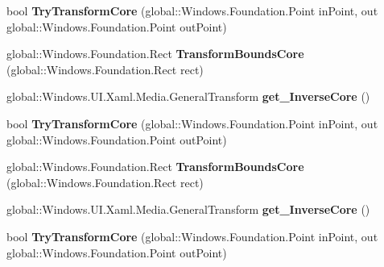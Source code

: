 \begin{DoxyCompactItemize}
bool {\bfseries Try\+Transform\+Core} (global\+::\+Windows.\+Foundation.\+Point in\+Point, out global\+::\+Windows.\+Foundation.\+Point out\+Point)
\item 
\mbox{\label{interface_windows_1_1_u_i_1_1_xaml_1_1_media_1_1_i_general_transform_overrides_a20e0e564fddb97a43b3c62931dd0dafa}} 
global\+::\+Windows.\+Foundation.\+Rect {\bfseries Transform\+Bounds\+Core} (global\+::\+Windows.\+Foundation.\+Rect rect)
\item 
\mbox{\label{interface_windows_1_1_u_i_1_1_xaml_1_1_media_1_1_i_general_transform_overrides_a7ee385c00a216b72154039895b723310}} 
global\+::\+Windows.\+U\+I.\+Xaml.\+Media.\+General\+Transform {\bfseries get\+\_\+\+Inverse\+Core} ()
\item 
\mbox{\label{interface_windows_1_1_u_i_1_1_xaml_1_1_media_1_1_i_general_transform_overrides_a6af63aa723b299fb2551d307070b5098}} 
bool {\bfseries Try\+Transform\+Core} (global\+::\+Windows.\+Foundation.\+Point in\+Point, out global\+::\+Windows.\+Foundation.\+Point out\+Point)
\item 
\mbox{\label{interface_windows_1_1_u_i_1_1_xaml_1_1_media_1_1_i_general_transform_overrides_a20e0e564fddb97a43b3c62931dd0dafa}} 
global\+::\+Windows.\+Foundation.\+Rect {\bfseries Transform\+Bounds\+Core} (global\+::\+Windows.\+Foundation.\+Rect rect)
\item 
\mbox{\label{interface_windows_1_1_u_i_1_1_xaml_1_1_media_1_1_i_general_transform_overrides_a7ee385c00a216b72154039895b723310}} 
global\+::\+Windows.\+U\+I.\+Xaml.\+Media.\+General\+Transform {\bfseries get\+\_\+\+Inverse\+Core} ()
\item 
\mbox{\label{interface_windows_1_1_u_i_1_1_xaml_1_1_media_1_1_i_general_transform_overrides_a6af63aa723b299fb2551d307070b5098}} 
bool {\bfseries Try\+Transform\+Core} (global\+::\+Windows.\+Foundation.\+Point in\+Point, out global\+::\+Windows.\+Foundation.\+Point out\+Point)

\end{DoxyCompactItemize}
